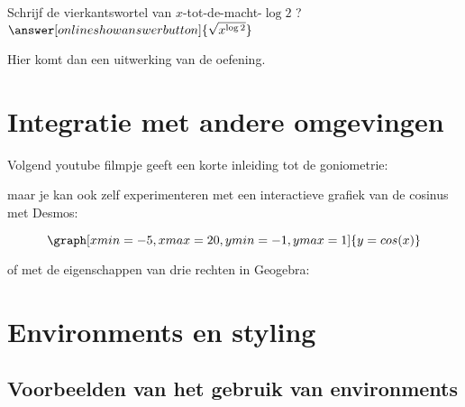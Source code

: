 \documentclass{ximera}
\begin{document}
\begin{exercise}
\begin{question}
        Schrijf de vierkantswortel van $x$-tot-de-macht-$\log 2$ ?  $\answer[onlineshowanswerbutton]{\sqrt{x^{\log 2}}}$
		\begin{oplossing}[toon]
			Hier komt dan een uitwerking van de oefening.
		\end{oplossing}
	\end{question}
\end{exercise}


\section{Integratie met andere omgevingen}

Volgend youtube filmpje geeft een korte inleiding tot de goniometrie:
\begin{center}
\end{center}


maar je kan ook zelf experimenteren met een interactieve grafiek van de cosinus met Desmos:

\[  
\graph[xmin=-5,xmax=20,ymin=-1,ymax=1]{y=cos(x)}  
\] 


of met de eigenschappen van drie rechten in Geogebra:

\begin{center}
\end{center}



\section{Environments en styling}

\subsection{Voorbeelden van het gebruik van environments}
\end{document}
